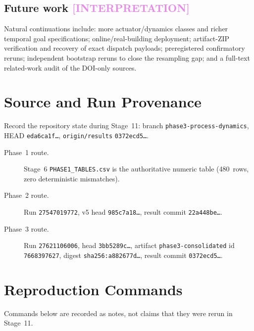 \documentclass[12pt, a4paper, oneside]{memoir}
\newcommand{\evInterp}{\textcolor{violet}{[INTERPRETATION]}}
\begin{document}
\section{Future work \evInterp}
\label{sec:conc-future}

Natural continuations include: more actuator/dynamics classes and richer
temporal goal specifications; online/real-building deployment;
artifact-ZIP verification and recovery of exact dispatch payloads;
preregistered confirmatory reruns; independent bootstrap reruns to close the
resampling gap; and a full-text related-work audit of the DOI-only sources.

\appendix
\chapter{Source and Run Provenance}
\label{app:provenance}

Record the repository state during Stage~11: branch
\texttt{phase3-process-dynamics}, HEAD \texttt{eda6ca1f\ldots},
\texttt{origin/results} \texttt{0372ecd5\ldots}.

\begin{description}
  \item[Phase~1 route.]
    Stage~6 \texttt{PHASE1\_TABLES.csv} is the authoritative numeric table
    (480~rows, zero deterministic mismatches).

  \item[Phase~2 route.]
    Run \texttt{27547019772}, v5 head \texttt{985c7a18\ldots}, result commit
    \texttt{22a448be\ldots}.

  \item[Phase~3 route.]
    Run \texttt{27621106006}, head \texttt{3bb5289c\ldots}, artifact
    \texttt{phase3-consolidated} id \texttt{7668397627}, digest
    \texttt{sha256:a882677d\ldots}, result commit \texttt{0372ecd5\ldots}.
\end{description}

\chapter{Reproduction Commands}
\label{app:reproduction}

Commands below are recorded as notes, not claims that they were rerun in
Stage~11.
\end{document}
